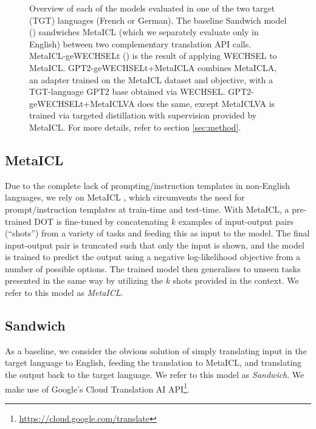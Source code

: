 \documentclass[11pt]{article}
\begin{document}
\begin{figure}[ht]
	\caption{Overview of each of the models evaluated in one of the two target (TGT) languages (French
		or German). The baseline \textcolor[HTML]{79d6ae}{Sandwich} model ()
		sandwiches \textcolor[HTML]{332345}{MetaICL} \citep{min_metaicl_2022} (which we separately
		evaluate only in English) between two complementary translation API calls.
		\textcolor[HTML]{38AAAC}{MetaICL-geWECHSELt} () is the result of
		applying WECHSEL \citep{minixhofer_wechsel_2022} to MetaICL.
		\textcolor[HTML]{357aa2}{GPT2-geWECHSELt+MetaICLA} combines \textcolor{Dandelion}{MetaICLA}, an
		adapter trained on the MetaICL dataset and objective, with a TGT-language GPT2 base obtained via
		WECHSEL. \textcolor[HTML]{40498e}{GPT2-geWECHSELt+MetaICLVA} does the same, except
		\textcolor{Dandelion}{MetaICLVA} is trained via targeted distillation with supervision provided
		by MetaICL. For more details, refer to section \ref{sec:method}.}
	\label{fig:method}
\end{figure}

\subsection{MetaICL}

Due to the complete lack of prompting/instruction templates in non-English languages, we rely on
MetaICL \citep{min_metaicl_2022}, which circumvents the need for prompt/instruction templates at
train-time and test-time. With MetaICL, a pre-trained DOT is fine-tuned by concatenating $k$ examples
of input-output pairs (``shots'') from a variety of tasks and feeding this as input to the model.
The final input-output pair is truncated such that only the input is shown, and the model is trained
to predict the output using a negative log-likelihood objective from a number of possible options.
The trained model then generalises to unseen tasks presented in the same way by utilizing the $k$
shots provided in the context.  We refer to this model as \textit{MetaICL}.

\subsection{Sandwich}

As a baseline, we consider the obvious solution of simply translating input in the target language
to English, feeding the translation to MetaICL, and translating the output back to the target
language. We refer to this model as \textit{Sandwich}. We make use of Google's Cloud Translation AI
API\footnote{\href{https://cloud.google.com/translate}{https://cloud.google.com/translate}}.
\end{document}
